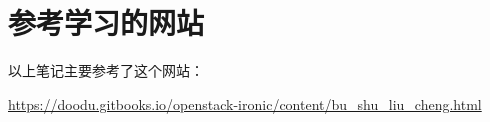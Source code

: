 \documentclass[a4paper,left=1.5cm,right=1.5cm,11pt]{article}
\begin{document}
\section{参考学习的网站}
	以上笔记主要参考了这个网站：\par
	\url{https://doodu.gitbooks.io/openstack-ironic/content/bu_shu_liu_cheng.html}
\end{document}
